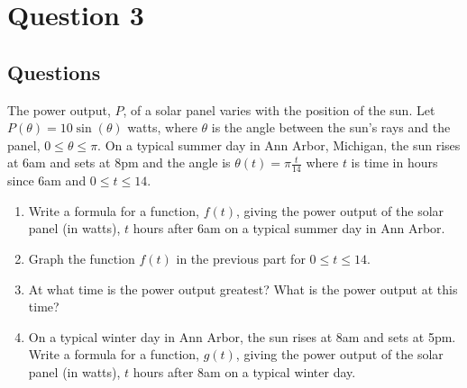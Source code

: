 \chapter{Question 3}
\section{Questions}
The power output, $P$, of a solar panel varies with the position of the sun. Let
$P(\theta) = 10\sin(\theta)$ watts, where $\theta$ is the angle between the
sun's rays and the panel, $0 \leq \theta \leq \pi$. On a typical summer day in
Ann Arbor, Michigan, the sun rises at 6am and sets at 8pm and the angle is
$\theta(t) = \pi\frac{t}{14}$ where $t$ is time in hours since 6am and
$0 \leq t \leq 14$.

\begin{enumerate}
  \item Write a formula for a function, $f(t)$, giving the power output of the
  solar panel (in watts), $t$ hours after 6am on a typical summer day in Ann
  Arbor.
  \item Graph the function $f(t)$ in the previous part for $0 \leq t \leq 14$.
  \item At what time is the power output greatest? What is the power output at
  this time?
  \item On a typical winter day in Ann Arbor, the sun rises at 8am and sets at
  5pm. Write a formula for a function, $g(t)$, giving the power output of the
  solar panel (in watts), $t$ hours after 8am on a typical winter day.
\end{enumerate}

